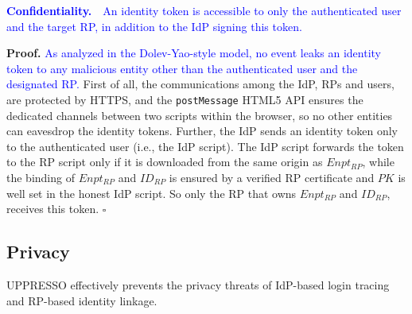 {{%



\vspace{1mm}
\noindent\textcolor{blue}{\textbf{Confidentiality.}~~An identity token
    is accessible to only
                the authenticated user and the target RP, in addition to the IdP signing this token.}

\vspace{0.75mm}
\noindent\textbf{Proof.}
\textcolor{blue}{As analyzed in the Dolev-Yao-style model, no event leaks an identity token to any malicious entity other than the authenticated user and the designated RP.}
First of all, the communications among the IdP, RPs and users,
    are protected by HTTPS,
    and the \verb+postMessage+ HTML5 API ensures the dedicated channels between two scripts within the browser,
    so no other entities can eavesdrop the identity tokens.
Further, the IdP sends an identity token only to the authenticated user
        (i.e., the IdP script).
The IdP script forwards the token to the RP script
 only if it is downloaded from the same origin as $Enpt_{RP}$,
while the binding of $Enpt_{RP}$ and $ID_{RP}$ is ensured by a verified RP certificate
    and $PK$ is well set in the honest IdP script.
So only the RP that owns $Enpt_{RP}$ and $ID_{RP}$,
    receives this token. $\square$



\subsection{Privacy}
\label{sec-:analysis}
UPPRESSO effectively prevents the privacy threats of IdP-based login tracing and RP-based identity linkage.

}}
